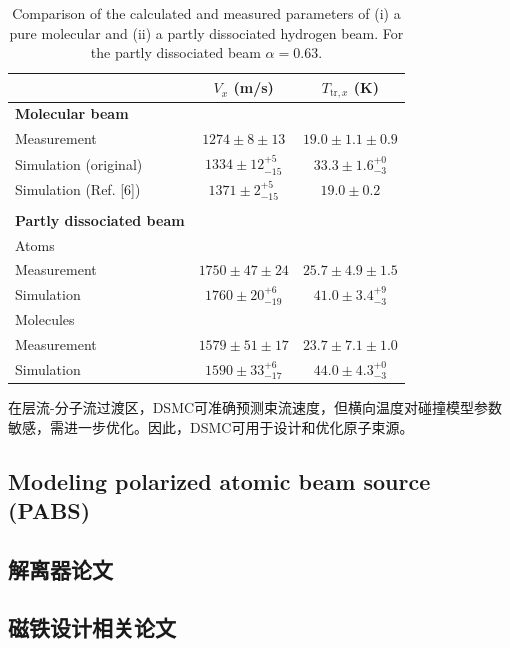 \documentclass{article}
\numberwithin{equation}{subsection} %
\numberwithin{figure}{subsection} %
\numberwithin{table}{subsection} %
\begin{document}
\begin{table}[h!]
\centering
\caption{Comparison of the calculated and measured parameters of (i) a pure molecular and (ii) a partly dissociated hydrogen beam. For the partly dissociated beam $\alpha = 0.63$.}
\label{tab:beam_parameters_comparison}
\begin{tabular}{lcc}
\hline
 & $V_x$ (m/s) & $T_{\text{tr},x}$ (K) \\
\hline
\textbf{Molecular beam} & & \\
\quad Measurement & $1274 \pm 8 \pm 13$ & $19.0 \pm 1.1 \pm 0.9$ \\
\quad Simulation (original) & $1334 \pm 12^{+5}_{-15}$ & $33.3 \pm 1.6^{+0}_{-3}$ \\
\quad Simulation (Ref. [6]) & $1371 \pm 2^{+5}_{-15}$ & $19.0 \pm 0.2$ \\
\\
\textbf{Partly dissociated beam} & & \\
\quad Atoms & & \\
\quad\quad Measurement & $1750 \pm 47 \pm 24$ & $25.7 \pm 4.9 \pm 1.5$ \\
\quad\quad Simulation & $1760 \pm 20^{+6}_{-19}$ & $41.0 \pm 3.4^{+9}_{-3}$ \\
\quad Molecules & & \\
\quad\quad Measurement & $1579 \pm 51 \pm 17$ & $23.7 \pm 7.1 \pm 1.0$ \\
\quad\quad Simulation & $1590 \pm 33^{+6}_{-17}$ & $44.0 \pm 4.3^{+0}_{-3}$ \\
\hline
\end{tabular}
\end{table} 
在层流-分子流过渡区，DSMC可准确预测束流速度，但横向温度对碰撞模型参数敏感，需进一步优化。因此，DSMC可用于设计和优化原子束源。

\subsection{Modeling polarized atomic beam source (PABS)\cite{larionov_modeling_2025}}

\subsection*{解离器论文}


\subsection*{磁铁设计相关论文}
\end{document}
